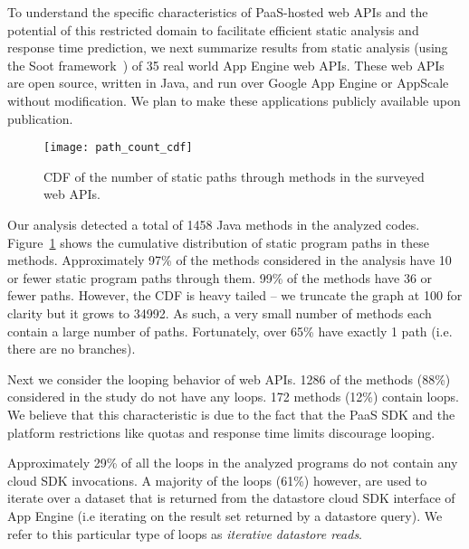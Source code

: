 
To understand the specific characteristics of PaaS-hosted web APIs and the potential
of this restricted domain to facilitate efficient static analysis and response time 
prediction,  we next summarize results from static analysis (using the Soot
framework~\cite{Vallee-Rai:2010:SJB:1925805.1925818}) of 
35 real world App Engine web APIs. These web APIs are open 
source, written in Java, and run over Google App Engine or AppScale without modification.
We plan to make these applications publicly available upon publication.  

\begin{figure}
\centering
\texttt{[image: path\_count\_cdf]}
\caption{CDF of the number of static paths through methods in the surveyed web APIs.
\label{fig:path_count_cdf}
}
\vspace{-0.1in}
\end{figure}

Our analysis detected a total of 1458 Java methods in the analyzed codes.
Figure~\ref{fig:path_count_cdf} shows the cumulative distribution of 
static program paths in these methods.
Approximately 97\% of the methods considered in the analysis have 10 or fewer 
static program paths through them.  99\% of 
the methods have 36 or fewer paths.
However, the CDF is heavy tailed --
we truncate the graph at 100 for clarity but it grows to 34992. As such, 
a very small number of methods 
each contain a large number of paths.
Fortunately, over 65\% have exactly 1 path (i.e. there are no branches).

Next we consider the looping behavior of web APIs.  1286 of the methods (88\%)
considered in the study
do not have any loops. 172 methods (12\%) contain loops. 
We believe that this characteristic is due to the fact that 
the PaaS SDK and the platform restrictions like quotas and response time limits 
discourage looping.

Approximately 29\% of all the loops in 
the analyzed programs do not contain any cloud SDK invocations. 
A majority of the loops (61\%) however, are
used to iterate over a dataset that is returned from the datastore cloud SDK interface 
of App Engine (i.e iterating on the result set 
returned by a datastore query). We refer to this particular type of 
loops as \textit{iterative datastore reads}. 

